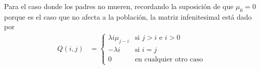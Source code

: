 Para el caso donde los padres no mueren, recordando la suposición de que $\mu_0 = 0$ porque es el caso que no afecta a la población,
la matriz infenitesimal está dado por
\begin{align}
        Q(i,j)  &=
                \begin{cases}
                    \lambda i \mu_{j-i}     &    \text{si $j > i$ e $i > 0$}        \\
                    -\lambda i              &    \text{si $i = j$}                  \\
                    0                       &    \text{en cualquier otro caso}
                \end{cases}
\end{align}